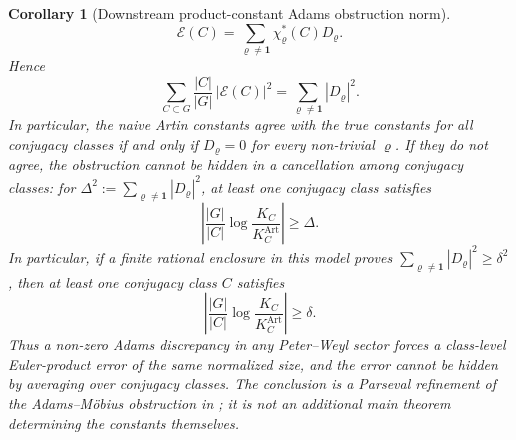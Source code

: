 \documentclass[11pt,a4paper]{amsart}
\theoremstyle{plain}
\newtheorem{corollary}[theorem]{Corollary}
\theoremstyle{definition}
\theoremstyle{remark}
\begin{document}
\begin{corollary}[Downstream product-constant Adams obstruction norm]
\begin{equation}
    \mathcal E(C)=
    \sum_{\varrho\neq\mathbf1}\chi_\varrho^\ast(C)D_\varrho .
  \end{equation}
  Hence
  \begin{equation}\label{eq:adams-obstruction-bound-parseval}
    \sum_{C\subset G}\frac{|C|}{|G|}\,|\mathcal E(C)|^2
    =
    \sum_{\varrho\neq\mathbf1}|D_\varrho|^2.
  \end{equation}
  In particular, the naive Artin constants agree with the true constants for
  all conjugacy classes if and only if \(D_\varrho=0\) for every non-trivial
  \(\varrho\).  If they do not agree, the obstruction cannot be hidden in a
  cancellation among conjugacy classes: for
  \(\Delta^2:=\sum_{\varrho\neq\mathbf1}|D_\varrho|^2\), at least one
  conjugacy class satisfies
  \begin{equation}\label{eq:adams-obstruction-bound-sup-lower-bound}
    \left|
      \frac{|G|}{|C|}
      \log\frac{K_C}{K_C^{\mathrm{Art}}}
    \right|
    \ge \Delta .
  \end{equation}
  In particular, if a finite rational enclosure in this model proves
  \(\sum_{\varrho\neq\mathbf1}|D_\varrho|^2\ge \delta^2\), then at least
  one conjugacy class \(C\) satisfies
  \begin{equation}\label{eq:adams-obstruction-bound-lower-bound}
    \left|
      \frac{|G|}{|C|}
      \log\frac{K_C}{K_C^{\mathrm{Art}}}
    \right|
    \ge \delta.
  \end{equation}
  Thus a non-zero Adams discrepancy in any Peter--Weyl sector forces a
  class-level Euler-product error of the same normalized size, and the
  error cannot be hidden by averaging over conjugacy classes.  The conclusion
  is a Parseval refinement of the Adams--M\"obius obstruction in
  ; it is not an additional main
  theorem determining the constants themselves.
\end{corollary}
\end{document}
